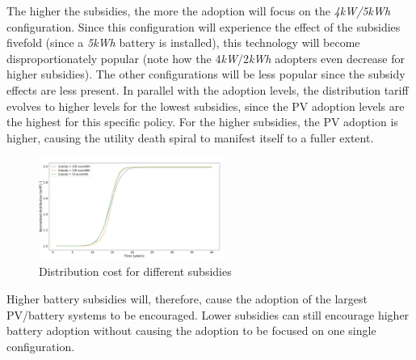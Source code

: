  The higher the subsidies, the more the adoption will focus on the \textit{4kW/5kWh} configuration. 
Since this configuration will experience the effect of the subsidies fivefold (since a \textit{5kWh} battery is installed), this technology will become disproportionately popular (note how the 4\textit{kW}/2\textit{kWh} adopters even decrease for higher subsidies). The other configurations will be less popular since the subsidy effects are less present. In parallel with the adoption levels, the distribution tariff evolves to higher levels for the lowest subsidies, since the PV adoption levels are the highest for this specific policy. For the higher subsidies, the PV adoption is higher, causing the utility death spiral to manifest itself to a fuller extent.  
\begin{figure}[h!]
\centering
\includegraphics[width=6cm]{ModelAnalysis/Distsubs.png}
\caption{Distribution cost for different subsidies}
\label{Figure:distsubvol}
\end{figure}
 \noindent
Higher battery subsidies will, therefore, cause the adoption of the largest PV/battery systems to be encouraged. Lower subsidies can still encourage higher battery adoption without causing the adoption to be focused on one single configuration.
